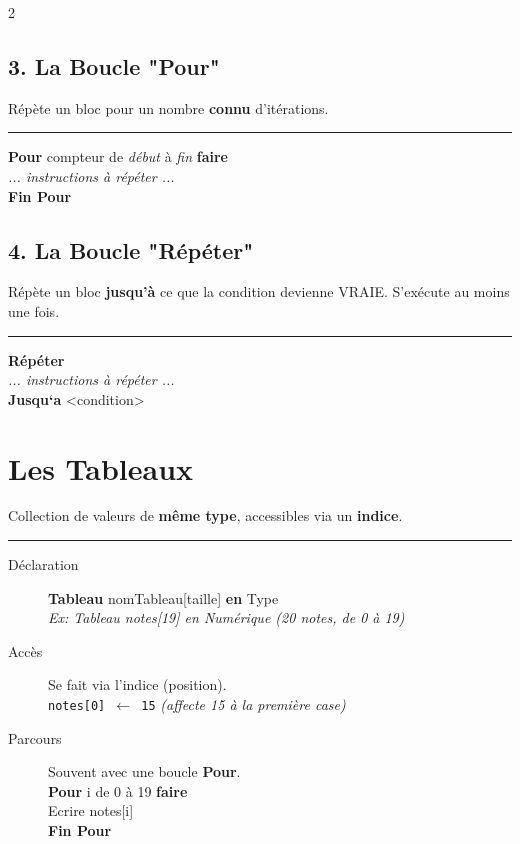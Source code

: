 \documentclass[10pt,a4paper]{article}
\newcommand{\code}[1]{\texttt{#1}}
\begin{document}
\begin{multicols}{2}
\subsection*{3. La Boucle "Pour"}
Répète un bloc pour un nombre \textbf{connu} d'itérations.
\hrule
\vspace{1mm}
\textbf{Pour} compteur de \textit{début} à \textit{fin} \textbf{faire} \\
\quad \textit{... instructions à répéter ...} \\
\textbf{Fin Pour}

\subsection*{4. La Boucle "Répéter"}
Répète un bloc \textbf{jusqu'à} ce que la condition devienne VRAIE. S'exécute au moins une fois.
\hrule
\vspace{1mm}
\textbf{Répéter} \\
\quad \textit{... instructions à répéter ...} \\
\textbf{Jusqu`a} <condition>

\section*{Les Tableaux}
Collection de valeurs de \textbf{même type}, accessibles via un \textbf{indice}.
\hrule
\begin{description}
    \item[Déclaration] \textbf{Tableau} nomTableau[taille] \textbf{en} Type \\ \textit{Ex: Tableau notes[19] en Numérique (20 notes, de 0 à 19)}
    \item[Accès] Se fait via l'indice (position). \\ \code{notes[0] $\leftarrow$ 15} \textit{ (affecte 15 à la première case)}
    \item[Parcours] Souvent avec une boucle \textbf{Pour}. \\
    \textbf{Pour} i de 0 à 19 \textbf{faire} \\
    \quad Ecrire notes[i] \\
    \textbf{Fin Pour}
\end{description}

\end{multicols}
\end{document}
